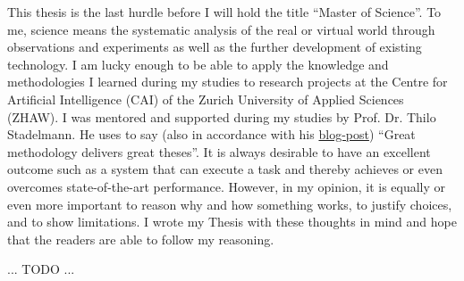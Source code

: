 \small
This thesis is the last hurdle before I will hold the title ``Master of Science''.
To me, science means the systematic analysis of the real or virtual world through observations and experiments as well as the further development of existing technology. 
I am lucky enough to be able to apply the knowledge and methodologies I learned during my studies to research projects at the Centre for Artificial Intelligence (CAI) of the Zurich University of Applied Sciences (ZHAW).
I was mentored and supported during my studies by Prof. Dr. Thilo Stadelmann.
He uses to say (also in accordance with his \href{https://stdm.github.io/Great-methodology-delivers-great-theses/}{blog-post}) ``Great methodology delivers great theses''.
It is always desirable to have an excellent outcome such as a system that can execute a task and thereby achieves or even overcomes state-of-the-art performance.
However, in my opinion, it is equally or even more important to reason why and how something works, to justify choices, and to show limitations.
I wrote my Thesis with these thoughts in mind and hope that the readers are able to follow my reasoning.

... TODO ...


\normalsize
